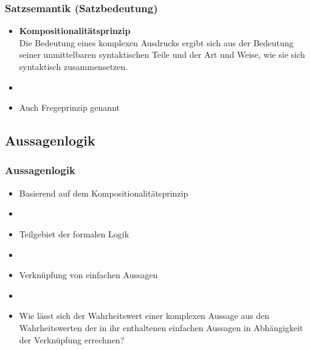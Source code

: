 
\begin{frame}
\frametitle{Satzsemantik (Satzbedeutung)}

\begin{itemize}
	\item \textbf{Kompositionalitätsprinzip}\\
Die Bedeutung eines komplexen Ausdrucks ergibt sich aus der Bedeutung seiner unmittelbaren syntaktischen Teile und der Art und Weise, wie sie sich syntaktisch zusammensetzen.
	\item[]
	\item Auch Fregeprinzip genannt
\end{itemize}

\end{frame}


%
\subsection{Aussagenlogik}


\begin{frame}
\frametitle{Aussagenlogik}

\begin{itemize}
	\item Basierend auf dem Kompositionalitätsprinzip
	\item[]
	\item Teilgebiet der formalen Logik
	\item[]
	\item Verknüpfung von einfachen Aussagen
	\item[]
	\item Wie lässt sich der Wahrheitswert einer komplexen Aussage aus den Wahrheitswerten der in ihr enthaltenen einfachen Aussagen in Abhängigkeit der Verknüpfung errechnen?
\end{itemize}

\end{frame}



